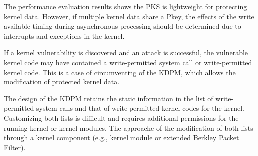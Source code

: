 The performance evaluation results shows the PKS is lightweight for protecting
kernel data.
%
However, if multiple kernel data share a Pkey, 
the effects of the write available timing during asynchronous processing should
be determined due to interrupts and exceptions in the kernel. 
% 


If a kernel vulnerability is discovered and an attack is successful, the
vulnerable kernel code may have contained a write-permitted system call or
write-permitted kernel code. This is a case of circumventing of the KDPM, which
allows the modification of protected kernel data.

The design of the KDPM retains the static information in the list of write-permitted system
calls and that of write-permitted kernel codes for the kernel. %
Customizing both lists is difficult and requires additional permissions for the
running kernel or kernel modules. 
%
The approache of the modification of both lists through a kernel component
(e.g., kernel module or extended Berkley Packet Filter).

 





